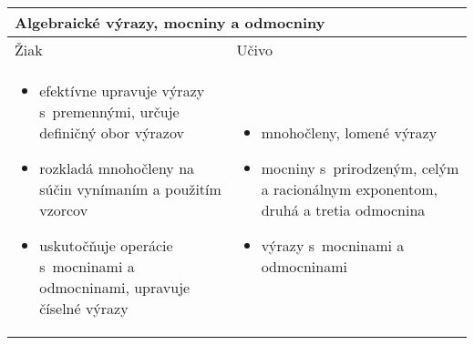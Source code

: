 \noindent \begin{tabularx}{\textwidth} { XX }
\toprule
\multicolumn{2}{p{\textwidth}}{Algebraické výrazy, mocniny a odmocniny} \\ \midrule
  Žiak & Učivo \\ \vspace{-10pt}
  \begin{itemize}
    \item efektívne upravuje výrazy s~premennými, určuje definičný obor výrazov
    \item rozkladá mnohočleny na súčin vynímaním a použitím vzorcov
    \item uskutočňuje operácie s~mocninami a odmocninami, upravuje číselné výrazy
  \end{itemize} &  \vspace{-10pt}
  \begin{itemize}
    \item mnohočleny, lomené výrazy
    \item mocniny s~prirodzeným, celým a racionálnym exponentom, druhá a tretia odmocnina
    \item výrazy s~mocninami a odmocninami
  \end{itemize} \\ \midrule
\end{tabularx}

